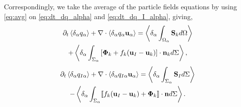 Correspondingly, we take the average of the particle fields equations by using \ref{eq:avg} on \ref{eq:dt_dq_alpha} and \ref{eq:dt_dq_I_alpha}, giving, 
\begin{multline}
    \partial_t \left<\delta_\alpha  q_\alpha\right>
    + \mathbf{\nabla}\cdot \left<\delta_\alpha  q_\alpha \textbf{u}_\alpha\right>
    = \left<\delta_\alpha \int_{\Omega_\alpha} \textbf{S}_k d\Omega\right>\\
    + \left<\delta_\alpha \int_{\Sigma_\alpha} \left[\mathbf{\Phi}_k + f_k (\textbf{u}_I-\textbf{u}_k) \right] \cdot \textbf{n}_k d\Sigma\right>,
    \label{eq:avg_dt_dq_alpha}
\end{multline}
\begin{multline}
    \partial_t \left<\delta_\alpha  q_{I\alpha}\right>
    + \mathbf{\nabla}\cdot \left<\delta_\alpha  q_{I\alpha} \textbf{u}_\alpha\right>
    = \left<\delta_\alpha \int_{\Sigma_\alpha} 
    \textbf{S}_I
    d\Sigma\right>\\
    - \left<\delta_\alpha \int_{\Sigma_\alpha} \llbracket 
        f_k (\textbf{u}_I - \textbf{u}_k)
        + \mathbf{\Phi}_k \rrbracket \cdot \textbf{n}
        d\Sigma\right>.
        \label{eq:avg_dt_dq_I_alpha}
\end{multline}
